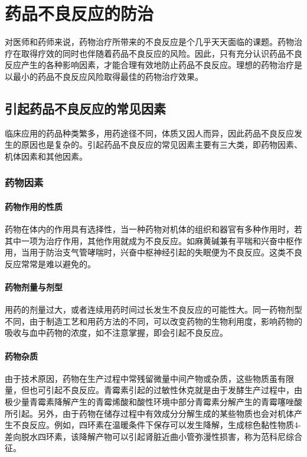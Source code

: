 \section{药品不良反应的防治}

对医师和药师来说，药物治疗所带来的不良反应是个几乎天天面临的课题。药物治疗在取得疗效的同时也伴随着药品不良反应的风险。因此，只有充分认识药品不良反应产生的各种影响因素，才能合理有效地防止药品不良反应。理想的药物治疗是以最小的药品不良反应风险取得最佳的药物治疗效果。

\subsection{引起药品不良反应的常见因素}

临床应用的药品种类繁多，用药途径不同，体质又因人而异，因此药品不良反应发生的原因也是复杂的。引起药品不良反应的常见因素主要有三大类，即药物因素、机体因素和其他因素。

\subsubsection{药物因素}
\paragraph{药物作用的性质}

药物在体内的作用具有选择性，当一种药物对机体的组织和器官有多种作用时，若其中一项为治疗作用，其他作用就成为不良反应。如麻黄碱兼有平喘和兴奋中枢作用，当用于防治支气管哮喘时，兴奋中枢神经引起的失眠便为不良反应。这类不良反应常常是难以避免的。
\paragraph{药物剂量与剂型}

用药的剂量过大，或者连续用药时间过长发生不良反应的可能性大。同一药物剂型不同，由于制造工艺和用药方法的不同，可以改变药物的生物利用度，影响药物的吸收与血中药物的浓度，如不注意掌握，即会引起不良反应。
\paragraph{药物杂质}

由于技术原因，药物在生产过程中常残留微量中间产物或杂质，这些物质虽有限量，但也可引起不良反应。青霉素引起的过敏性休克就是由于发酵生产过程中，由极少量青霉素降解产生的青霉烯酸和酸性环境中部分青霉素分解产生的青霉噻唑酸所引起。另外，由于药物在储存过程中有效成分分解生成的某些物质也会对机体产生不良反应。例如，四环素在温暖条件下保存可以发生降解，生成棕色黏性物质4-差向脱水四环素，该降解产物可以引起肾脏近曲小管弥漫性损害，称为范科尼综合征。
